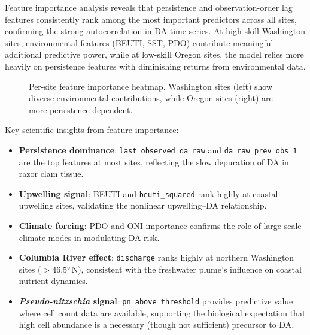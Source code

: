 \documentclass[preprint,12pt,authoryear]{elsarticle}
\begin{document}
Feature importance analysis reveals that persistence and observation-order lag features consistently rank among the most important predictors across all sites, confirming the strong autocorrelation in DA time series. At high-skill Washington sites, environmental features (BEUTI, SST, PDO) contribute meaningful additional predictive power, while at low-skill Oregon sites, the model relies more heavily on persistence features with diminishing returns from environmental data.

\begin{figure}[!htbp]
\centering
{}
\caption{Per-site feature importance heatmap. Washington sites (left) show diverse environmental contributions, while Oregon sites (right) are more persistence-dependent.}
\label{fig:feature-heatmap}
\end{figure}

Key scientific insights from feature importance:
\begin{itemize}[nosep]
    \item \textbf{Persistence dominance}: \texttt{last\_observed\_da\_raw} and \texttt{da\_raw\_prev\_obs\_1} are the top features at most sites, reflecting the slow depuration of DA in razor clam tissue.
    \item \textbf{Upwelling signal}: BEUTI and \texttt{beuti\_squared} rank highly at coastal upwelling sites, validating the nonlinear upwelling--DA relationship.
    \item \textbf{Climate forcing}: PDO and ONI importance confirms the role of large-scale climate modes in modulating DA risk.
    \item \textbf{Columbia River effect}: \texttt{discharge} ranks highly at northern Washington sites ($> \ang{46.5}$\,N), consistent with the freshwater plume's influence on coastal nutrient dynamics.
    \item \textbf{\textit{Pseudo-nitzschia} signal}: \texttt{pn\_above\_threshold} provides predictive value where cell count data are available, supporting the biological expectation that high cell abundance is a necessary (though not sufficient) precursor to DA.
\end{itemize}
\end{document}
